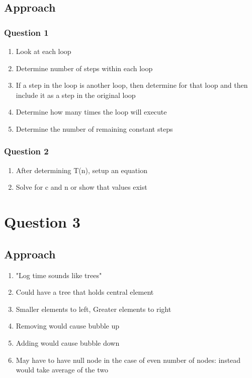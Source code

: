 \documentclass{article}
\begin{document}
\subsection{Approach}

\subsubsection{Question 1}
\begin{enumerate}
    \item Look at each loop
    \item Determine number of steps within each loop
    \item If a step in the loop is another loop, then determine for that loop and then include it as a step in the original loop
    \item Determine how many times the loop will execute
    \item Determine the number of remaining constant steps
\end{enumerate}

\subsubsection{Question 2}
\begin{enumerate}
    \item After determining T(n), setup an equation
    \item Solve for c and n or show that values exist
\end{enumerate}

\section{Question 3}
\subsection{Approach}
\begin{enumerate}
    \item "Log time sounds like trees"
    \item Could have a tree that holds central element
    \item Smaller elements to left, Greater elements to right
    \item Removing would cause bubble up
    \item Adding would cause bubble down
    \item May have to have null node in the case of even number of nodes: instead would take average of the two
\end{enumerate}
\end{document}
